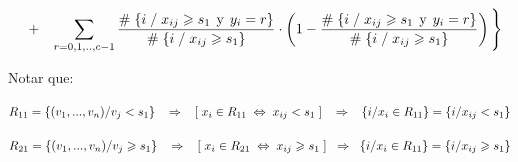 \documentclass[
  11pt,
  a4paper,
]{article}
\begin{document}
\begin{gather*}
\hspace{0.3cm} +  \hspace{0.3cm}         \sum_{r=0,1,..,c-1}^{}  \dfrac{\# \hspace{0.1 cm}\lbrace i \hspace{0.1 cm}/\hspace{0.1 cm} x_{ij} \geqslant s_1 \hspace{0.15 cm}\text{y}\hspace{0.15 cm} y_i = r \rbrace}{\# \hspace{0.1 cm}\lbrace i \hspace{0.1 cm}/\hspace{0.1 cm} x_{ij} \geqslant s_1 \rbrace}  \cdot \left(   1 - \dfrac{\# \hspace{0.1 cm}\lbrace i \hspace{0.1 cm}/\hspace{0.1 cm} x_{ij} \geqslant s_1 \hspace{0.15 cm}\text{y}\hspace{0.15 cm} y_i = r \rbrace}{\# \hspace{0.1 cm}\lbrace i \hspace{0.1 cm}/\hspace{0.1 cm} x_{ij} \geqslant s_1 \rbrace}  \right)           \Biggl\} 
\end{gather*}

\vspace{1.5cm}

Notar que:

\vspace{0.5cm}

\(R_{11} = \lbrace (v_1 ,..., v_n) / v_j < s_1 \rbrace \hspace{0.3cm}\Rightarrow\hspace{0.3cm} [\hspace{0.1cm} x_i \in R_{11} \hspace{0.1cm} \Leftrightarrow \hspace{0.1cm} x_{ij} < s_1 \hspace{0.1cm}] \hspace{0.3cm}\Rightarrow\hspace{0.3cm} \lbrace i/x_i \in R_{11} \rbrace = \lbrace i / x_{ij} < s_1 \rbrace\)

\(R_{21} = \lbrace (v_1 ,..., v_n) / v_j \geqslant s_1 \rbrace \hspace{0.3cm}\Rightarrow\hspace{0.3cm} [\hspace{0.1cm} x_i \in R_{21} \hspace{0.1cm} \Leftrightarrow \hspace{0.1cm} x_{ij} \geqslant s_1 \hspace{0.1cm}] \hspace{0.2cm}\Rightarrow\hspace{0.2cm} \lbrace i/x_i \in R_{11} \rbrace = \lbrace i / x_{ij} \geqslant s_1 \rbrace\)
\end{document}
